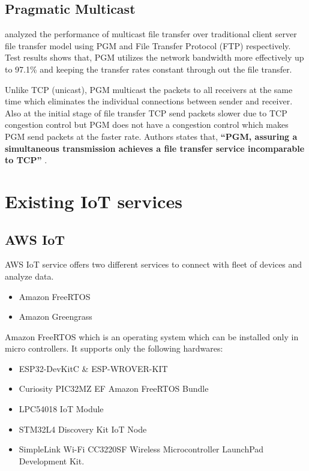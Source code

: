 \documentclass[12pt]{article}
\begin{document}
\subsection{Pragmatic Multicast}

{\protect\NoHyper\citeauthor{marrone}\protect\endNoHyper} \cite{marrone} analyzed the performance of multicast file transfer over traditional client server file transfer model using PGM and File Transfer Protocol (FTP) respectively. Test results shows that, PGM utilizes the network bandwidth more effectively up to 97.1\% \cite{marrone} and keeping the transfer rates constant through out the file transfer.

Unlike TCP (unicast), PGM multicast the packets to all receivers at the same time which eliminates the individual connections between sender and receiver. Also at the initial stage of file transfer TCP send packets slower due to TCP congestion control but PGM does not have a congestion control which makes PGM send packets at the faster rate. Authors states that, \textbf{``PGM, assuring a simultaneous transmission achieves a file transfer service incomparable to TCP''} \cite{marrone}.


\section{Existing IoT services}

\subsection{AWS IoT}

AWS IoT service offers two different services to connect with fleet of devices and analyze data.

\begin{itemize}
	\item Amazon FreeRTOS
	\item Amazon Greengrass	
\end{itemize}


Amazon FreeRTOS which is an operating system which can be installed only in micro controllers. It supports only the following hardwares:

\begin{itemize}
	\item ESP32-DevKitC \& ESP-WROVER-KIT
	\item Curiosity PIC32MZ EF Amazon FreeRTOS Bundle
	\item LPC54018 IoT Module
	\item STM32L4 Discovery Kit IoT Node
	\item SimpleLink Wi-Fi CC3220SF Wireless Microcontroller LaunchPad Development Kit.	
\end{itemize}
\end{document}
